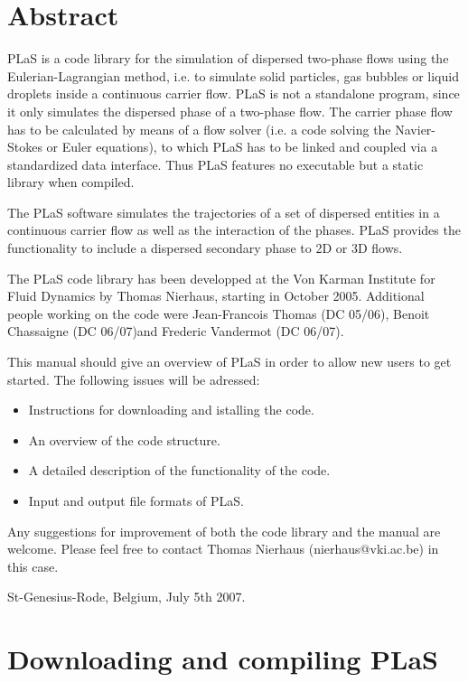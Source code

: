 \documentclass[12pt]{article}
\begin{document}
\section*{Abstract}
\label{sec:abstract}

PLaS is a code library for the simulation of dispersed two-phase flows using the Eulerian-Lagrangian method, i.e. to simulate solid particles, gas bubbles or liquid droplets inside a continuous carrier flow. PLaS is not a standalone program, since it only simulates the dispersed phase of a two-phase flow. The carrier phase flow has to be calculated by means of a flow solver (i.e. a code solving the Navier-Stokes or Euler equations), to which PLaS has to be linked and coupled via a standardized data interface. Thus PLaS features no executable but a static library when compiled.

The PLaS software simulates the trajectories of a set of dispersed entities in a continuous carrier flow as well as the interaction of the phases. PLaS provides the functionality to include a dispersed secondary phase to 2D or 3D flows.

The PLaS code library has been developped at the Von Karman Institute for Fluid Dynamics by Thomas Nierhaus, starting in October 2005. Additional people working on the code were Jean-Francois Thomas (DC 05/06), Benoit Chassaigne (DC 06/07)and Frederic Vandermot (DC 06/07).

This manual should give an overview of PLaS in order to allow new users to get started. The following issues will be adressed:

\begin{itemize}
\item Instructions for downloading and istalling the code.
\item An overview of the code structure.
\item A detailed description of the functionality of the code.
\item Input and output file formats of PLaS.
\end{itemize}

 Any suggestions for improvement of both the code library and the manual are welcome. Please feel free to contact Thomas Nierhaus (nierhaus@vki.ac.be) in this case.
 
St-Genesius-Rode, Belgium, July 5th 2007.

\newpage
\tableofcontents

\newpage
\section{Downloading and compiling PLaS}
\label{sec:compile}
\end{document}
